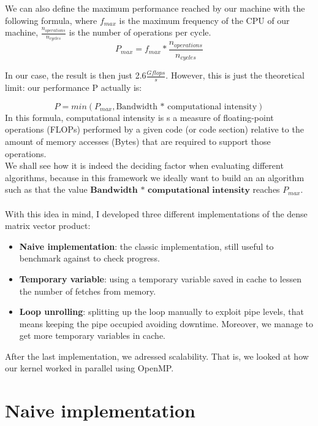 \documentclass[11pt,a4paper,oneside,titlepage,openright]{book}
\begin{document}
We can also define the maximum performance reached by our machine with the following formula, where $f_{max}$ is the maximum frequency of the CPU of our machine, $\frac{n_{operations}}{n_{cycles}}$ is the number of operations per cycle. 
$$P_{max} = f_{max} * \frac{n_{operations}}{n_{cycles}}$$ 

In our case, the result is then just 2.6$\frac{Gflops}{s}$.
However, this is just the theoretical limit: our performance P actually is: 

$$ P = min(P_{max}, \text{Bandwidth * computational intensity}) $$
In this formula, computational intensity is s a measure of floating-point operations (FLOPs) performed by a given code (or code section) relative to the amount of memory accesses (Bytes) that are required to support those operations. \\
We shall see how it is indeed the deciding factor when evaluating different algorithms, because in this framework we ideally want to build an an algorithm such as that the value $\textbf{Bandwidth * computational intensity}$ reaches $P_{max}$.\\\\
With this idea in mind, I developed three different implementations of the dense matrix vector product:

\begin{itemize}
\item \textbf{Naive implementation}: the classic implementation, still useful to benchmark against to check progress. 
\item \textbf{Temporary variable}: using a temporary variable saved in cache to  lessen the number of fetches from memory. 
\item \textbf{Loop unrolling}: splitting up the loop manually to exploit pipe levels, that means keeping the pipe occupied avoiding  downtime. Moreover, we manage to get more temporary variables in cache.
\end{itemize}
After the last implementation, we adressed scalability. That is, we looked at how our kernel worked in parallel using OpenMP.




\chapter{Naive implementation}
\end{document}

